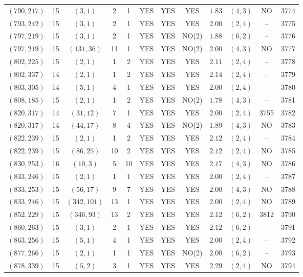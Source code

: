 \begin{longtable}{|c|c|c|c|c|c|c|c|c|c|c|c|}
$(790,217)$ & 15 & $(3,1)$ & 2 & 1 & YES & YES & YES & $1.83$ & $(4,3)$ & NO & 3774\\
$(793,242)$ & 15 & $(3,1)$ & 2 & 1 & YES & YES & YES & $2.00$ & $(2,4)$ & -- & 3775\\
$(797,219)$ & 15 & $(3,1)$ & 2 & 1 & YES & YES & NO(2) & $1.88$ & $(6,2)$ & -- & 3776\\
$(797,219)$ & 15 & $(131,36)$ & 11 & 1 & YES & YES & NO(2) & $2.00$ & $(4,3)$ & NO & 3777\\
$(802,225)$ & 15 & $(2,1)$ & 1 & 2 & YES & YES & YES & $2.11$ & $(2,4)$ & -- & 3778\\
$(802,337)$ & 14 & $(2,1)$ & 1 & 2 & YES & YES & YES & $2.14$ & $(2,4)$ & -- & 3779\\
$(803,305)$ & 14 & $(5,1)$ & 4 & 1 & YES & YES & YES & $2.00$ & $(2,4)$ & -- & 3780\\
$(808,185)$ & 15 & $(2,1)$ & 1 & 2 & YES & YES & NO(2) & $1.78$ & $(4,3)$ & -- & 3781\\
$(820,317)$ & 14 & $(31,12)$ & 7 & 1 & YES & YES & YES & $2.00$ & $(2,4)$ & 3755 & 3782\\
$(820,317)$ & 14 & $(44,17)$ & 8 & 4 & YES & YES & NO(2) & $1.89$ & $(4,3)$ & NO & 3783\\
$(822,239)$ & 15 & $(2,1)$ & 1 & 2 & YES & YES & YES & $2.12$ & $(2,4)$ & -- & 3784\\
$(822,239)$ & 15 & $(86,25)$ & 10 & 2 & YES & YES & YES & $2.12$ & $(2,4)$ & NO & 3785\\
$(830,253)$ & 16 & $(10,3)$ & 5 & 10 & YES & YES & YES & $2.17$ & $(4,3)$ & NO & 3786\\
$(833,246)$ & 15 & $(2,1)$ & 1 & 1 & YES & YES & YES & $2.00$ & $(2,4)$ & -- & 3787\\
$(833,253)$ & 15 & $(56,17)$ & 9 & 7 & YES & YES & YES & $2.00$ & $(4,3)$ & NO & 3788\\
$(833,246)$ & 15 & $(342,101)$ & 13 & 1 & YES & YES & YES & $2.00$ & $(2,4)$ & NO & 3789\\
$(852,229)$ & 15 & $(346,93)$ & 13 & 2 & YES & YES & YES & $2.12$ & $(6,2)$ & 3812 & 3790\\
$(860,263)$ & 15 & $(3,1)$ & 2 & 1 & YES & YES & YES & $2.12$ & $(6,2)$ & -- & 3791\\
$(863,256)$ & 15 & $(5,1)$ & 4 & 1 & YES & YES & YES & $2.00$ & $(2,4)$ & -- & 3792\\
$(877,266)$ & 15 & $(2,1)$ & 1 & 1 & YES & YES & NO(2) & $2.00$ & $(6,2)$ & -- & 3793\\
$(878,339)$ & 15 & $(5,2)$ & 3 & 1 & YES & YES & YES & $2.29$ & $(2,4)$ & NO & 3794\\

\end{longtable}
